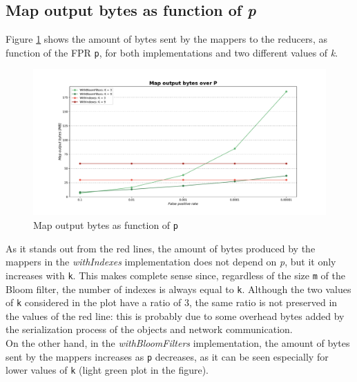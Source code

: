 \subsection*{Map output bytes as function of \textit{p}}

Figure \ref{fig:MapOutputBytesP} shows the amount of bytes sent by the mappers to the reducers, as function of the FPR \texttt{p}, for both implementations and two different values of \textit{k}.\\

\begin{figure}[H]
    \begin{center}
        \includegraphics[scale=.45,trim={3cm 0 3cm 0},clip]{img/MapOutputBytesP.pdf}
    \end{center}
    \vspace*{-0.5cm}
    \caption{Map output bytes as function of \texttt{p}}
    \label{fig:MapOutputBytesP}
\end{figure}

\noindent As it stands out from the red lines, the amount of bytes produced by the mappers in the \textit{withIndexes} implementation does not depend on \textit{p}, but it only increases with \texttt{k}. This makes complete sense since, regardless of the size \texttt{m} of the Bloom filter, the number of indexes is always equal to \texttt{k}. Although the two values of \texttt{k} considered in the plot have a ratio of 3, the same ratio is not preserved in the values of the red line: this is probably due to some overhead bytes added by the serialization process of the objects and network communication.\\
On the other hand, in the \textit{withBloomFilters} implementation, the amount of bytes sent by the mappers increases as \texttt{p} decreases, as it can be seen especially for lower values of \texttt{k} (light green plot in the figure).

